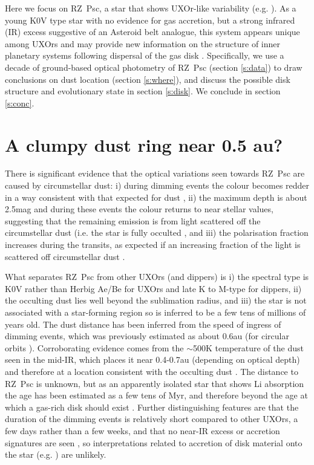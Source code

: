 \documentclass[]{rsos}
\begin{document}
Here we focus on RZ~Psc, a star that shows UXOr-like variability
(e.g. \cite{1985PZ.....22..181Z,1999A&AS..140..293G,2003ARep...47..580S}). As a young
K0V type star with no evidence for gas accretion, but a strong infrared (IR) excess
suggestive of an Asteroid belt analogue, this system appears unique among UXOrs and may
provide new information on the structure of inner planetary systems following dispersal
of the gas disk \cite{2010A&A...524A...8G,2013A&A...553L...1D}. Specifically, we use a
decade of ground-based optical photometry of RZ~Psc (section \ref{s:data}) to draw
conclusions on dust location (section \ref{s:where}), and discuss the possible disk
structure and evolutionary state in section \ref{s:disk}. We conclude in section
\ref{s:conc}.

\section{A clumpy dust ring near 0.5 au?}\label{s:rzpscintro}

There is significant evidence that the optical variations seen towards RZ~Psc are caused
by circumstellar dust: i) during dimming events the colour becomes redder
\cite{1985PZ.....22..181Z,1980PZ.....21..310K} in a way consistent with that expected for
dust \cite{1981Afz....17...87P,2004ARep...48..470P}, ii) the maximum depth is about
2.5mag and during these events the colour returns to near stellar values, suggesting that
the remaining emission is from light scattered off the circumstellar dust (i.e. the star
is fully occulted \cite{1981Afz....17...87P,1988SvAL...14...27G}, and iii) the
polarisation fraction increases during the transits, as expected if an increasing
fraction of the light is scattered off circumstellar dust
\cite{1988SvAL...14...27G,1991Afz....34..333K,2003ARep...47..580S}.

What separates RZ~Psc from other UXOrs (and dippers) is i) the spectral type is K0V
rather than Herbig Ae/Be for UXOrs and late K to M-type for dippers, ii) the occulting
dust lies well beyond the sublimation radius, and iii) the star is not associated with a
star-forming region so is inferred to be a few tens of millions of years old. The dust
distance has been inferred from the speed of ingress of dimming events, which was
previously estimated as about 0.6au (for circular orbits
\cite{2013A&A...553L...1D}). Corroborating evidence comes from the $\sim$500K temperature
of the dust seen in the mid-IR, which places it near 0.4-0.7au (depending on optical
depth) and therefore at a location consistent with the occulting dust
\cite{2013A&A...553L...1D}. The distance to RZ~Psc is unknown, but as an apparently
isolated star that shows Li absorption the age has been estimated as a few tens of Myr,
and therefore beyond the age at which a gas-rich disk should exist
\cite{2010A&A...524A...8G,2014A&A...563A.139P}. Further distinguishing features are that
the duration of the dimming events is relatively short compared to other UXOrs, a few
days rather than a few weeks, and that no near-IR excess or accretion signatures are seen
\cite{2014A&A...563A.139P}, so interpretations related to accretion of disk material onto
the star (e.g. \cite{1999AJ....118.1043H,1999A&A...349..619B,2016arXiv160503985B}) are
unlikely.
\end{document}
